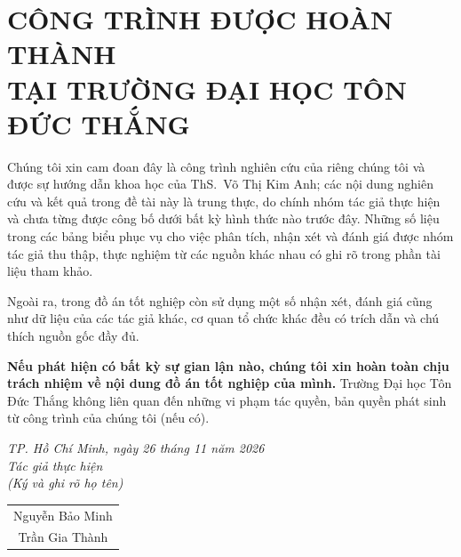 \clearpage
\pagestyle{empty}
\chapter*{CÔNG TRÌNH ĐƯỢC HOÀN THÀNH\\TẠI TRƯỜNG ĐẠI HỌC TÔN ĐỨC THẮNG}
\thispagestyle{empty}

\hspace*{\parindent}Chúng tôi xin cam đoan đây là công trình nghiên cứu của riêng chúng tôi và được sự hướng dẫn khoa học của ThS.\ Võ Thị Kim Anh; các nội dung nghiên cứu và kết quả trong đề tài này là trung thực, do chính nhóm tác giả thực hiện và chưa từng được công bố dưới bất kỳ hình thức nào trước đây. Những số liệu trong các bảng biểu phục vụ cho việc phân tích, nhận xét và đánh giá được nhóm tác giả thu thập, thực nghiệm từ các nguồn khác nhau có ghi rõ trong phần tài liệu tham khảo.

Ngoài ra, trong đồ án tốt nghiệp còn sử dụng một số nhận xét, đánh giá cũng như dữ liệu của các tác giả khác, cơ quan tổ chức khác đều có trích dẫn và chú thích nguồn gốc đầy đủ.

\textbf{Nếu phát hiện có bất kỳ sự gian lận nào, chúng tôi xin hoàn toàn chịu trách nhiệm về nội dung đồ án tốt nghiệp của mình.} Trường Đại học Tôn Đức Thắng không liên quan đến những vi phạm tác quyền, bản quyền phát sinh từ công trình của chúng tôi (nếu có).

\vspace*{1cm}
\begin{flushright}
	\begin{minipage}{8.75cm}
		\centering
		\textit{TP. Hồ Chí Minh, ngày 26 tháng 11 năm 2026}\\
		\textit{Tác giả thực hiện}\\
		\textit{(Ký và ghi rõ họ tên)}\\[1.6cm]

		\begin{tabular}{c}
			Nguyễn Bảo Minh \\[1.6cm]
			Trần Gia Thành \\
		\end{tabular}
	\end{minipage}
\end{flushright}
\clearpage
\pagestyle{fancy}
